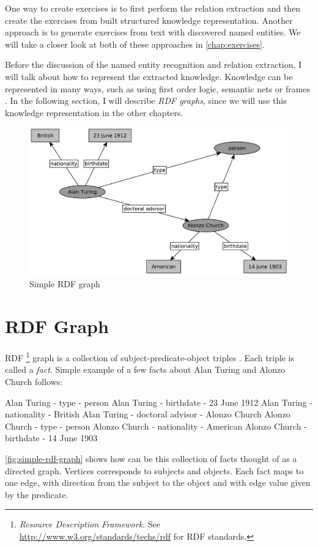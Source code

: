 \documentclass[12pt, twoside]{fithesis2}		%
\renewcommand{\_}{\leavevmode \kern0.07em\vbox{\hrule width0.4em}}
\begin{document}
One way to create exercises is to first perform the relation extraction and then create the exercises from built structured knowledge representation. Another approach is to generate exercises from text with discovered named entities. We will take a closer look at both of these approaches in \autoref{chap:exercises}.

Before the discussion of the named entity recognition and relation extraction,
I will talk about how to represent the extracted knowledge.
Knowledge can be represented in many ways,
such as using first order logic, semantic nets or frames \cite{knowledge-representation}.
In the following section, I will describe \emph{RDF graphs},
since we will use this knowledge representation in the other chapters.

\begin{figure}[h]
  \centering
  \includegraphics[width=\textwidth]{images/rdf-graph.pdf}
  \caption{Simple RDF graph}
  \label{fig:simple-rdf-graph}
\end{figure}

\section{RDF Graph}
\label{sec:rdf-graph}


RDF%
\footnote{\textit{Resource Description Framework}.
See \url{http://www.w3.org/standards/techs/rdf} for RDF standards.}
graph is a collection of subject-predicate-object triples \parencite[][63]{semantic-web}.
Each triple is called a \textit{fact}.
Simple example of a few facts about Alan Turing and Alonzo Church follows:
\begin{code}
Alan Turing - type - person
Alan Turing - birthdate - 23 June 1912
Alan Turing - nationality - British
Alan Turing - doctoral advisor - Alonzo Church
Alonzo Church - type - person
Alonzo Church - nationality - American
Alonzo Church - birthdate - 14 June 1903
\end{code}
\noindent
\autoref{fig:simple-rdf-graph} shows how can be this collection of facts thought of as a directed graph.
Vertices corresponds to subjects and objects. Each fact maps to one edge, with direction from the subject to the object and with edge value given by the predicate.
\end{document}

